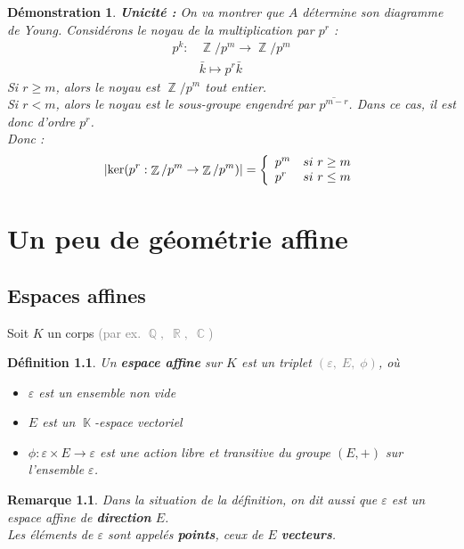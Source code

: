 \documentclass[a4paper, oneside]{report}
\theoremstyle{break}
\newtheorem{definition}[thm]{Définition}
\newtheorem{remarque}[thm]{Remarque}
\newtheorem*{demo}{Démonstration}
\newcommand{\sg}{sous-groupe }
\newcommand{\gray}[1]{\textcolor{gray}{#1}}
\DeclareMathOperator{\R}{\mathbb{R}}
\DeclareMathOperator{\K}{\mathbb{K}}
\DeclareMathOperator{\C}{\mathbb{C}}
\DeclareMathOperator{\Z}{\mathbb{Z}}
\DeclareMathOperator{\Q}{\mathbb{Q}}
\DeclarePairedDelimiter\abs{\lvert}{\rvert}%
\newcommand{\slign}{\textbf}
\begin{document}
\begin{demo}
\textbf{Unicité :} On va montrer que $A$ détermine son diagramme de Young. Considérons le noyau de la multiplication par $p^r$ :
\begin{align*}
p^k :&\Z/p^m \rightarrow \Z/p^m\\
&\bar{k} \mapsto p^r\bar{k}
\end{align*}
Si $r \geq m$, alors le noyau est $\Z/p^m$ tout entier.\\
Si $r < m$, alors le noyau est le \sg engendré par $\overline{p^{m-r}}$. Dans ce cas, il est donc d'ordre $p^r$.\\
Donc :
$$\abs{\ker(p^r : \Z/p^m \rightarrow \Z/p^m)}=\left\{\begin{array}{ll}
p^m& si~r\geq m\\
p^r& si~r \leq m
\end{array}\right.$$
\end{demo}






\chapter{Un peu de géométrie affine}

\section{Espaces affines}

Soit $K$ un corps \gray{(par ex. $\Q, \; \R, \; \C$)}

\begin{definition}
Un \slign{espace affine} sur $K$ est un triplet \gray{$(\varepsilon, \; E, \; \phi)$}, où
\begin{itemize}[label=$\bullet$]
\item $\varepsilon$ est un ensemble non vide

\item $E$ est un $\K$-espace vectoriel

\item $\phi : \varepsilon \times E \longrightarrow \varepsilon$ est une action libre et transitive du groupe $(E, +)$ sur l'ensemble $\varepsilon$.
\end{itemize}
\end{definition}

\begin{remarque}
Dans la situation de la définition, on dit aussi que $\varepsilon$ est un espace affine de \slign{direction} $E$.\\
Les éléments de $\varepsilon$ sont appelés \slign{points}, ceux de $E$ \slign{vecteurs}.
\end{remarque}
\end{document}
